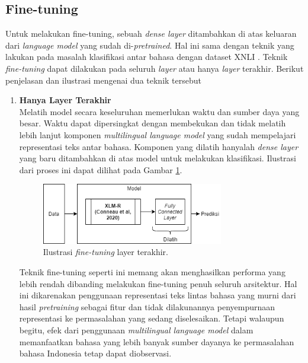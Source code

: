 	\subsection{Fine-tuning}
	Untuk melakukan fine-tuning, sebuah \textit{dense layer} ditambahkan di atas keluaran dari \textit{language model} yang sudah di-\textit{pretrained}. Hal ini sama dengan teknik yang \parencite{LampleConneau2019} lakukan pada masalah klasifikasi antar bahasa dengan dataset XNLI \parencite{Conneau_Rinott_Lample_Williams_Bowman_Schwenk_Stoyanov_2018}. Teknik \textit{fine-tuning} dapat dilakukan pada seluruh \textit{layer} atau hanya \textit{layer} terakhir. Berikut penjelasan dan ilustrasi mengenai dua teknik tersebut
	\begin{enumerate}
		\item \textbf{Hanya Layer Terakhir}\\	
		Melatih	model secara keseluruhan memerlukan waktu dan sumber daya yang besar. Waktu dapat dipersingkat dengan membekukan dan tidak melatih lebih lanjut komponen \textit{multilingual language model} yang sudah mempelajari representasi teks antar bahasa. Komponen yang dilatih hanyalah \textit{dense layer} yang baru ditambahkan di atas model untuk melakukan klasifikasi. Ilustrasi dari proses ini dapat dilihat pada Gambar \ref{fig:ilustrasi_head_fine_tune}.
		\begin{figure}[h]
		    \centering
		    \includegraphics[width=0.75\textwidth]{resources/Head-fine-tune.png}
		    \caption{ Ilustrasi \textit{fine-tuning} layer terakhir.}
		    \label{fig:ilustrasi_head_fine_tune}
		\end{figure}

		Teknik fine-tuning seperti ini memang akan menghasilkan performa yang lebih rendah dibanding melakukan fine-tuning penuh seluruh arsitektur. Hal ini dikarenakan penggunaan representasi teks lintas bahasa yang murni dari hasil \textit{pretraining} sebagai fitur dan tidak dilakunannya penyempurnaan representasi ke permasalahan yang sedang diselesaikan. Tetapi walaupun begitu, efek dari penggunaan \textit{multilingual language model} dalam memanfaatkan bahasa yang lebih banyak sumber dayanya ke permasalahan bahasa Indonesia tetap dapat diobservasi.


\end{enumerate}
